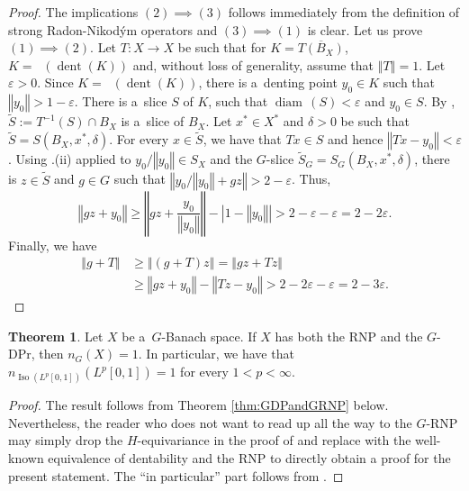 \documentclass[a4paper,12pt]{amsart}
\theoremstyle{definition}
\newtheorem{theorem}{Theorem}[section]
\theoremstyle{definition}
\theoremstyle{remark}
\numberwithin{equation}{section}
\newcommand{\clco}{\mathop{\overline{\mathrm{co}}}\nolimits}
\DeclareMathOperator{\diam}{diam\,}
\DeclareMathOperator{\iso}{Iso}
\renewcommand{\geq}{\geqslant}
\newcommand{\<}{\langle}
\renewcommand{\>}{\rangle}
\newcommand{\norm}[1]{\left\Vert#1\right\Vert}
\newcommand{\abs}[1]{\left\vert#1\right\vert}
\newcommand{\dent}[1]{\operatorname{dent}\left(#1\right)}
\newcommand{\e}{\varepsilon}
\newcommand{\eps}{\e}
\begin{document}
	\begin{proof}
		The implications $(2) \implies (3)$ follows immediately from the definition of strong Radon-Nikod\'ym operators and $(3) \implies (1)$ is clear. Let us prove $(1) \implies (2)$. Let $T : X \to X$ be such that for $K = \overline{T(B_X)}$, $K = \clco(\dent{K})$ and, without loss of generality, assume that $\norm{T} = 1$.
		Let $\eps > 0$. Since $K = \clco(\dent{K})$, there is a~denting point $y_0 \in K$ such that $\norm{y_0} > 1 - \eps$.
		There is a~slice $S$ of $K$, such that $\diam(S) < \eps$ and $y_0 \in S$.     By \cite[Lemma 2.6.5]{Kadets2000}, $\tilde{S} := T^{-1}(S) \cap B_X$ is a~slice of $B_X$. Let $x^* \in X^*$ and $\delta > 0$ be such that $\tilde{S} = S(B_X, x^*, \delta)$. For every $x \in \tilde{S}$, we have that $Tx \in S$ and hence $\norm{Tx - y_0} < \eps$. Using .(ii) applied to $ y_0 / \norm{y_0} \in S_X$ and the $G$-slice $\tilde{S}_G = S_G(B_X, x^*, \delta)$, there is $z \in \tilde{S}$ and $g \in G$ such that $\norm{y_0 / \norm{y_0} + gz} > 2 - \eps$. Thus,
		\begin{equation*}
			\norm{gz + y_0}
			\geq \norm{gz + \frac{y_0}{\norm{y_0}}} - \abs{1 - \norm{y_0}}
			> 2 - \eps - \eps = 2 - 2\eps.
		\end{equation*}
		Finally, we have
		\begin{align*}
			\norm{g + T}
			&\geq \norm{(g + T)z}
			= \norm{gz + Tz} \\
			&\geq \norm{gz + y_0} - \norm{Tz - y_0}
			> 2 - 2\eps - \eps = 2 - 3\eps.
	\end{align*}\end{proof}
	
	
	\begin{theorem} \label{thm:G-DPandRNP}
		Let $X$ be a~$G$-Banach space. If $X$ has both the RNP and the $G$-DPr, then $n_{G}(X) = 1$. In particular, we have that $n_{\iso(L^p[0,1])}(L^p[0,1]) = 1$  for every $1 < p < \infty$.
	\end{theorem}
	
	\begin{proof} The result follows from Theorem \ref{thm:GDPandGRNP} below. Nevertheless, the reader who does not want to read up all the way to the $G$-RNP may simply drop the $H$-equivariance in the proof of  and replace \cite[Theorem 6.4]{DantasDouchaJungRaunig2025} with the well-known equivalence of dentability and the RNP to directly obtain a proof for the present statement. The ``in particular'' part follows from .
	\end{proof}
	
\end{document}
